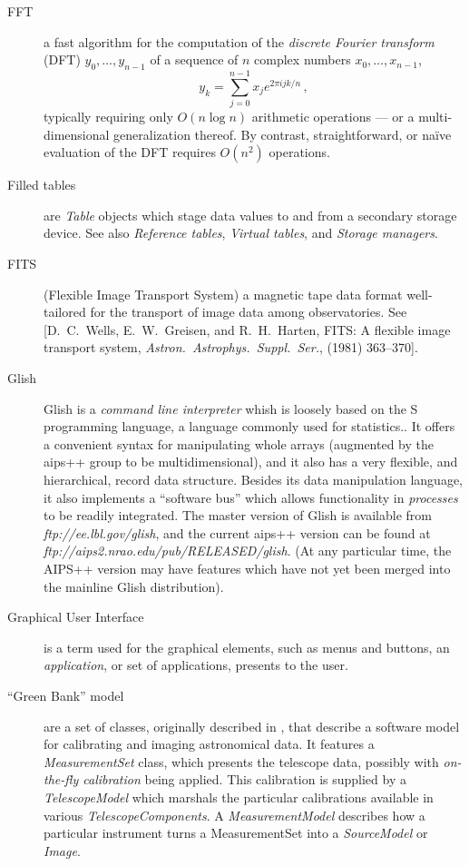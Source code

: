 \begin{description}
\item[FFT]
a fast algorithm for the computation of the {\it discrete Fourier
transform} (DFT) $y_0,\dots,y_{n-1}$ of a sequence of $n$ complex
numbers $x_0,\dots,x_{n-1}$, $$y_k=\sum_{j=0}^{n-1}x_j e^{2\pi
ijk/n}\,,$$ typically requiring only $O(n\log n)$ arithmetic
operations --- or a multi-dimensional generalization thereof.  By
contrast, straightforward, or na\"ive evaluation of the DFT requires
$O(n^2)$ operations.


\item[Filled tables] are {\em Table} objects which stage data
values to and from a secondary storage device. See also {\em Reference
tables}, {\em Virtual tables}, and {\em Storage managers}.

\item[FITS]
(Flexible Image Transport System) a magnetic tape data format
well-tailored for the transport of image data among observatories.
See [D.~C.~Wells, E.~W.~Greisen, and R.~H.~Harten, FITS: A flexible
image transport system, {\it Astron.\ Astrophys.\ Suppl.\ Ser.},
 (1981) 363--370].

\item[Glish]
Glish is a {\em command line interpreter} whish is loosely based on
the S programming language, a language commonly used for
statistics.. It offers a convenient syntax for manipulating whole
arrays (augmented by the {\sc aips++} group to be multidimensional),
and it also has a very flexible, and hierarchical, record data
structure. Besides its data manipulation language, it also implements
a ``software bus'' which allows functionality in {\em processes} to be
readily integrated. The master version of Glish is available from {\em
ftp://ee.lbl.gov/glish}, and the current {\sc aips++} version can be
found at {\em ftp://aips2.nrao.edu/pub/RELEASED/glish}. (At
any particular time, the AIPS++ version may have features which have
not yet been merged into the mainline Glish distribution).

\item[Graphical User Interface] is a term used for the graphical
elements, such as menus and buttons, an {\em application}, or set of
applications, presents to the user.

\item[``Green Bank'' model]
are a set of classes, originally described in \cite{shone:gb}, that
describe a software model for calibrating and imaging astronomical
data. It features a {\em MeasurementSet} class, which presents the
telescope data, possibly with {\em on-the-fly calibration} being
applied. This calibration is supplied by a {\em TelescopeModel} which
marshals the particular calibrations available in various {\em
TelescopeComponents}. A {\em MeasurementModel} describes how a
particular instrument turns a MeasurementSet into a {\em SourceModel}
or {\em Image}.



\end{description}
